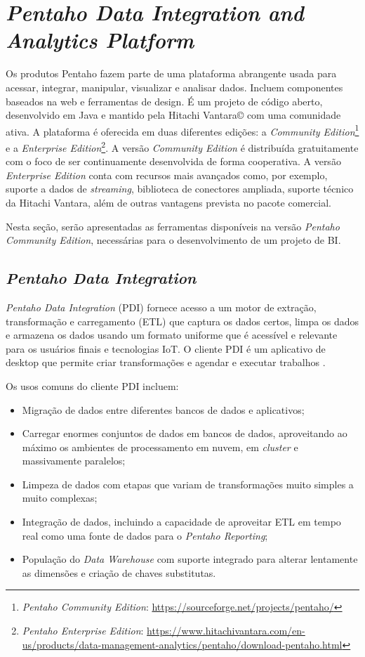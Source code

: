 \section{\textit{Pentaho Data Integration and Analytics Platform}}
Os produtos Pentaho fazem parte de uma plataforma abrangente usada para acessar, integrar, manipular, visualizar e analisar dados. Incluem componentes baseados na web e ferramentas de design. É um projeto de código aberto, desenvolvido em Java e mantido pela Hitachi Vantara© com uma comunidade ativa. A plataforma é oferecida em duas diferentes edições: a \textit{Community Edition}\footnote{\textit{Pentaho Community Edition}: \url{https://sourceforge.net/projects/pentaho/}} e a \textit{Enterprise Edition}\footnote{\textit{Pentaho Enterprise Edition}: \url{https://www.hitachivantara.com/en-us/products/data-management-analytics/pentaho/download-pentaho.html}}. A versão \textit{Community Edition} é distribuída gratuitamente com o foco de ser continuamente desenvolvida de forma cooperativa. A versão \textit{Enterprise Edition} conta com recursos mais avançados como, por exemplo, suporte a dados de \textit{streaming}, biblioteca de conectores ampliada, suporte técnico da Hitachi Vantara, além de outras vantagens prevista no pacote comercial. 

Nesta seção, serão apresentadas as ferramentas disponíveis na versão \textit{Pentaho Community Edition}, necessárias para o desenvolvimento de um projeto de BI.

\subsection{\textit{Pentaho Data Integration}}
\textit{Pentaho Data Integration} (PDI) fornece acesso a um motor de extração, transformação e carregamento (ETL) que captura os dados certos, limpa os dados e armazena os dados usando um formato uniforme que é acessível e relevante para os usuários finais e tecnologias IoT. O cliente PDI é um aplicativo de desktop que permite criar transformações e agendar e executar trabalhos \cite{pentahodocumentation}.

Os usos comuns do cliente PDI incluem:
\begin{itemize}
    \item Migração de dados entre diferentes bancos de dados e aplicativos;
    \item Carregar enormes conjuntos de dados em bancos de dados, aproveitando ao máximo os ambientes de processamento em nuvem, em \textit{cluster} e massivamente paralelos;
    \item Limpeza de dados com etapas que variam de transformações muito simples a muito complexas;
    \item Integração de dados, incluindo a capacidade de aproveitar ETL em tempo real como uma fonte de dados para o \textit{Pentaho Reporting};
    \item População do \textit{Data Warehouse} com suporte integrado para alterar lentamente as dimensões e criação de chaves substitutas.
\end{itemize}

